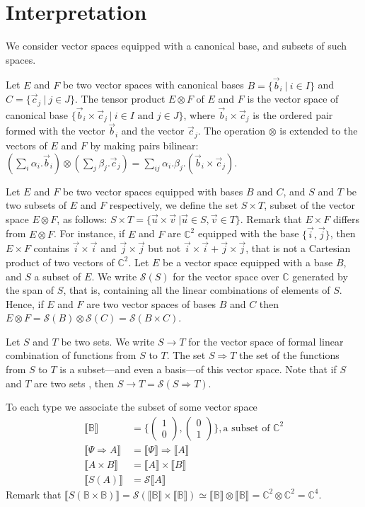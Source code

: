 \documentclass[preprint]{elsarticle}
\newcommand\B{\ensuremath{\mathbb B}}
\newcommand\gB{\ensuremath{\Psi}}
\newcommand\gen{\mathcal S} \newcommand\den[1]{\llbracket #1 \rrbracket}
\newcommand\vect[2]{\left(\begin{smallmatrix} #1 \\ #2\end{smallmatrix}\right)}
\begin{document}
\section{Interpretation}\label{sec:denSem}

We consider vector spaces equipped with a canonical base, and subsets of such
spaces.

Let $E$ and $F$ be two vector spaces with canonical bases $B = \{\vec{b}_i~|~i
\in I\}$ and $C = \{\vec{c}_j~|~j \in J\}$. The tensor product $E \otimes F$ of
$E$ and $F$ is the vector space of canonical base $\{\vec{b}_i \times
\vec{c}_j~|~i \in I \mbox{ and } j \in J\}$, where $\vec{b}_i \times \vec{c}_j$
is the ordered pair formed with the vector $\vec{b}_i$ and the vector
$\vec{c}_j$.
The operation $\otimes$ is extended to the vectors of $E$ and $F$ by making
pairs bilinear:
$(\sum_i \alpha_i . \vec{b}_i) \otimes (\sum_j \beta_j . \vec{c}_j) = \sum_{ij}
\alpha_i . \beta_j . (\vec{b}_i \times \vec{c}_j)$.

Let $E$ and $F$ be two vector spaces equipped with bases $B$ and $C$, and $S$
and $T$ be two subsets of $E$ and $F$ respectively, we define the set $S \times
T$, subset of the vector space $E \otimes F$, as follows: \( S \times T =
\{\vec{u} \times \vec{v}~| \vec{u} \in S, \vec{v} \in T\} \).
Remark that $E \times F$ differs from $E \otimes F$. For instance, if $E$ and
$F$ are ${\mathbb C}^2$ equipped with the base $\{\vec{i}, \vec{j}\}$, then $E
\times F$ contains $\vec{i} \times \vec{i}$ and $\vec j \times \vec j$ but not
$\vec i \times \vec i + \vec j \times \vec j$, that is not a Cartesian product of
two vectors of ${\mathbb C}^2$.
Let $E$ be a vector space equipped with a base $B$, and $S$ a subset of $E$. We
write $\gen(S)$ for the vector space over $\mathbb C$ generated by the span of
$S$, that is, containing all the linear combinations of elements of $S$.
Hence, if $E$ and $F$ are two vector spaces of bases $B$ and $C$ then $E \otimes
F = \gen(B) \otimes \gen(C) = \gen( B\times C)$.

Let $S$ and $T$ be two sets. We write $S \to T$ for the vector space of formal
linear combination of functions from $S$ to $T$. The set
$S \Rightarrow T$ the set of
the functions from $S$ to $T$ is a subset---and even a basis---of this vector
space.
Note that if $S$ and $T$ are two sets , then $S \to T = \gen (S \Rightarrow T)$.

To each type we associate the subset of some vector space
\begin{align*}
  \den{\B} &= \{\vect 10, \vect 01\}, \mbox{a subset of ${\mathbb C}^2$}\\
  \den{\gB\Rightarrow A}   &= \den{\gB}\Rightarrow\den A\\
  \den{A\times B} &= \den A\times \den B\\
  \den{S(A)} &= \gen\den A
\end{align*}
Remark that
\(\den{S(\B\times\B)}=\gen(\den\B\times\den\B)\simeq\den\B\otimes\den\B=\mathbb C^2\otimes\mathbb
C^2=\mathbb
C^4\).
\end{document}
